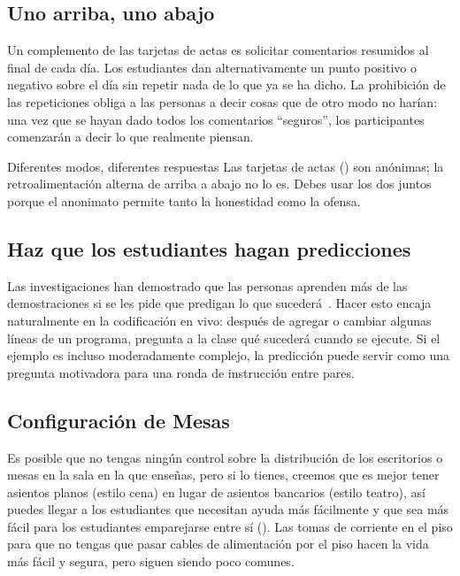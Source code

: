 \subsection*{Uno arriba, uno abajo}

Un complemento de las tarjetas de actas es solicitar comentarios resumidos al final de cada día.
Los estudiantes dan alternativamente un punto positivo o negativo sobre el día
sin repetir nada de lo que ya se ha dicho.
La prohibición de las repeticiones obliga a las personas a decir cosas que de otro modo no harían:
una vez que se hayan dado todos los comentarios ``seguros'',
los participantes comenzarán a decir lo que realmente piensan.

\begin{aside}{Diferentes modos, diferentes respuestas}
  Las tarjetas de actas () son anónimas;
  la retroalimentación alterna de arriba a abajo no lo es.
  Debes usar los dos juntos
  porque el anonimato permite tanto la honestidad como la ofensa.
\end{aside}

\subsection*{Haz que los estudiantes hagan predicciones}

Las investigaciones han demostrado que las personas aprenden más de las demostraciones
si se les pide que predigan lo que sucederá~\cite{Mill2013}.
Hacer esto encaja naturalmente en la codificación en vivo:
después de agregar o cambiar algunas líneas de un programa,
pregunta a la clase qué sucederá cuando se ejecute.
Si el ejemplo es incluso moderadamente complejo,
la predicción puede servir como una pregunta motivadora para una ronda de instrucción entre pares.

\subsection*{Configuración de Mesas}

Es posible que no tengas ningún control sobre la distribución de los escritorios o mesas
en la sala en la que enseñas,
pero si lo tienes,
creemos que es mejor tener asientos planos (estilo cena)
en lugar de asientos bancarios (estilo teatro),
así puedes llegar a los estudiantes que necesitan ayuda más fácilmente
y que sea más fácil para los estudiantes emparejarse entre sí ().
Las tomas de corriente en el piso para que no tengas que pasar cables de alimentación por el piso
hacen la vida más fácil y segura,
pero siguen siendo poco comunes.

